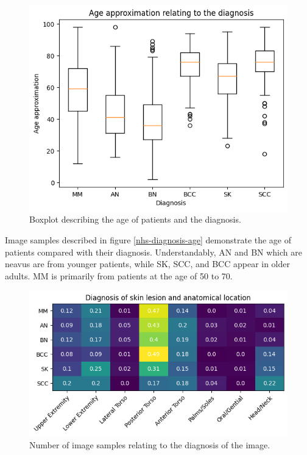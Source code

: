 \begin{figure}
    \centering
    \includegraphics[scale=0.75]{images/nhs/nhs-diagnosis-age.png}
    \caption{Boxplot describing the age of patients and the diagnosis.} 
\end{figure}\label{nhs-diagnosis-age}

Image samples described in figure \ref{nhs-diagnosis-age} demonstrate the age of patients compared with their diagnosis. Understandably, AN and BN which are neavus are from younger patients, while SK, SCC, and BCC appear in older adults. MM is primarily from patients at the age of 50 to 70.

\begin{figure}
    \centering
    \includegraphics[scale=0.75]{images/nhs/nhs-location-diagnosis.png}
    \caption{Number of image samples relating to the diagnosis of the image.} 
\end{figure}\label{nhs-location-diagnosis}

